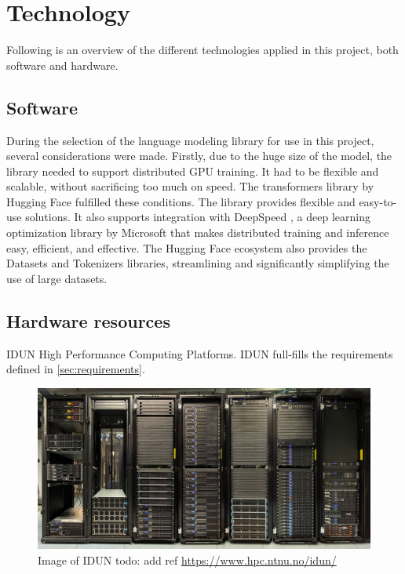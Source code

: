 \section{Technology}
\label{sec:technology}
Following is an overview of the different technologies applied in this project, both software and hardware.

\subsection{Software}
\label{sec:software}
During the selection of the language modeling library for use in this project, several considerations were made. Firstly, due to the huge size of the model, the library needed to support distributed GPU training. It had to be flexible and scalable, without sacrificing too much on speed. The transformers \cite{transformers} library by Hugging Face \cite{hugging-face} fulfilled these conditions. The library provides flexible and easy-to-use solutions. It also supports integration with DeepSpeed \cite{deepspeed}, a deep learning optimization library by Microsoft \cite{microsoft} that makes distributed training and inference easy, efficient, and effective. The Hugging Face ecosystem also provides the Datasets and Tokenizers libraries, streamlining and significantly simplifying the use of large datasets.

\subsection{Hardware resources}
\label{sec:hardware-resources}

IDUN High Performance Computing Platforms.
IDUN full-fills the requirements defined in \cref{sec:requirements}.

\begin{figure}[htp]
    \centering
    \includegraphics[width=\textwidth]{figures/idun.jpeg}
    \caption{Image of IDUN todo: add ref \url{https://www.hpc.ntnu.no/idun/}}
    \label{fig:flowchart}
\end{figure}
